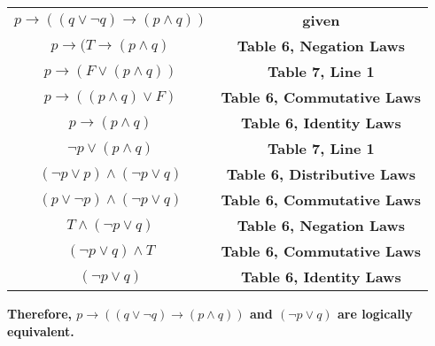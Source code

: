\documentclass[12pt]{article}
\begin{document}
\begin{table}[H]
\centering
\begin{tabular}{|c|c|}
\hline

\textbf{$p \rightarrow ((q \vee \neg q) \rightarrow (p \land q))$} & \textbf{given} \\
\textbf{$p \rightarrow (T \rightarrow (p \land q)$} & \textbf{Table 6, Negation Laws} \\
\textbf{$p \rightarrow (F \vee (p \land q))$} & \textbf{Table 7, Line 1} \\
\textbf{$p \rightarrow ((p \land q) \vee F)$} & \textbf{Table 6, Commutative Laws} \\
\textbf{$p \rightarrow (p \land q)$} & \textbf{Table 6, Identity Laws} \\
\textbf{$\neg p \vee (p \land q)$} & \textbf{Table 7, Line 1} \\
\textbf{$(\neg p \vee p) \land (\neg p \vee q)$} & \textbf{Table 6, Distributive Laws}\\
\textbf{$(p \vee \neg p) \land (\neg p \vee q)$} & \textbf{Table 6, Commutative Laws}\\
\textbf{$T \land (\neg p \vee q)$} & \textbf{Table 6, Negation Laws} \\
\textbf{$(\neg p \vee q) \land T$} & \textbf{Table 6, Commutative Laws} \\
\textbf{$(\neg p \vee q)$} & \textbf{Table 6, Identity Laws} \\

\hline
\end{tabular}
\end{table}
\textbf{Therefore, $p \rightarrow ((q \vee \neg q) \rightarrow (p \land q))$ and $(\neg p \vee q)$ are logically equivalent.}\\
\end{document}
